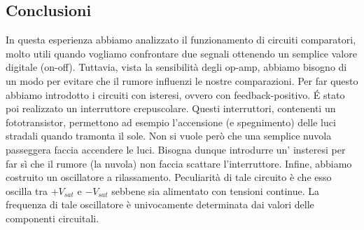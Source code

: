 \subsection*{Conclusioni}

In questa esperienza abbiamo analizzato il funzionamento di circuiti comparatori, molto utili quando vogliamo confrontare due segnali ottenendo un semplice valore digitale (on-off). Tuttavia, vista la sensibilità degli op-amp, abbiamo bisogno di un modo per evitare che il rumore influenzi le nostre comparazioni. Per far questo abbiamo introdotto i circuiti con isteresi, ovvero con feedback-positivo. \'E stato poi realizzato un interruttore crepuscolare. Questi interruttori, contenenti un fototransistor, permettono ad esempio l'accensione (e spegnimento) delle luci stradali quando tramonta il sole. Non si vuole però che una semplice nuvola passeggera faccia accendere le luci. Bisogna dunque introdurre un' insteresi per far sì che il rumore (la nuvola) non faccia scattare l'interruttore. Infine, abbiamo costruito un oscillatore a rilassamento. Peculiarità di tale circuito è che esso oscilla tra $+V_{sat}$ e $-V_{sat}$ sebbene sia alimentato con tensioni continue. La frequenza di tale oscillatore è univocamente determinata dai valori delle componenti circuitali.
